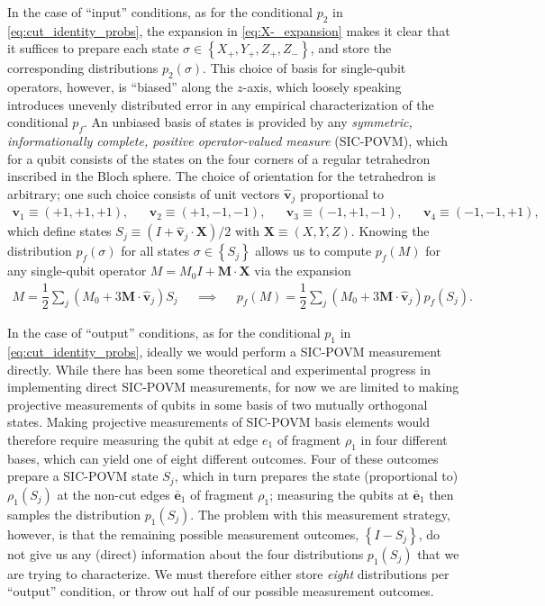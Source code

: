 \documentclass[nofootinbib,notitlepage,11pt]{revtex4-2}
\newcommand{\f}[2]{\dfrac{#1}{#2}} %
\newcommand{\p}[1]{\left(#1\right)} %
\renewcommand{\set}[1]{\left\{#1\right\}} %
\renewcommand{\v}{\bm} %
\newcommand{\uv}[1]{\bm{\hat{#1}}} %
\renewcommand{\c}{\cdot} %
\begin{document}
In the case of ``input'' conditions, as for the conditional $p_2$ in
\eqref{eq:cut_identity_probs}, the expansion in
\eqref{eq:X-_expansion} makes it clear that it suffices to prepare
each state $\sigma \in \set{X_+,Y_+,Z_+,Z_-}$, and store the
corresponding distributions $p_2\p{\sigma}$.  This choice of basis for
single-qubit operators, however, is ``biased'' along the $z$-axis,
which loosely speaking introduces unevenly distributed error in any
empirical characterization of the conditional $p_f$.  An unbiased
basis of states is provided by any {\it symmetric, informationally
  complete, positive operator-valued measure} (SIC-POVM), which for a
qubit consists of the states on the four corners of a regular
tetrahedron inscribed in the Bloch sphere.  The choice of orientation
for the tetrahedron is arbitrary; one such choice consists of unit
vectors $\uv v_j$ proportional to
\begin{align}
  \v v_1 \equiv \p{ +1, +1, +1 }, &&
  \v v_2 \equiv \p{ +1, -1, -1 }, &&
  \v v_3 \equiv \p{ -1, +1, -1 }, &&
  \v v_4 \equiv \p{ -1, -1, +1 },
\end{align}
which define states $S_j\equiv\p{I+\uv v_j\c\v X}/2$ with
$\v X\equiv\p{X,Y,Z}$.  Knowing the distribution $p_f\p{\sigma}$ for
all states $\sigma\in\set{S_j}$ allows us to compute $p_f\p{M}$ for
any single-qubit operator $M=M_0I+\v M\c\v X$ via the expansion
\begin{align}
  M = \f12 \sum_j \p{ M_0 + 3 \v M\c\uv v_j } S_j
  &&
  \implies
  &&
  p_f\p{M} = \f12 \sum_j \p{ M_0 + 3 \v M\c\uv v_j } p_f\p{S_j}.
  \label{eq:SIC_expansion}
\end{align}

In the case of ``output'' conditions, as for the conditional $p_1$ in
\eqref{eq:cut_identity_probs}, ideally we would perform a SIC-POVM
measurement directly.  While there has been some
theoretical\cite{tabia2012experimental} and
experimental\cite{bent2015experimental, bian2015realization} progress
in implementing direct SIC-POVM measurements, for now we are limited
to making projective measurements of qubits in some basis of two
mutually orthogonal states.  Making projective measurements of
SIC-POVM basis elements would therefore require measuring the qubit at
edge $e_1$ of fragment $\rho_1$ in four different bases, which can
yield one of eight different outcomes.  Four of these outcomes prepare
a SIC-POVM state $S_j$, which in turn prepares the state (proportional
to) $\rho_1\p{S_j}$ at the non-cut edges $\bar{\v e}_1$ of fragment
$\rho_1$; measuring the qubits at $\bar{\v e}_1$ then samples the
distribution $p_1\p{S_j}$.  The problem with this measurement
strategy, however, is that the remaining possible measurement
outcomes, $\set{I-S_j}$, do not give us any (direct) information about
the four distributions $p_1\p{S_j}$ that we are trying to
characterize.  We must therefore either store {\it eight}
distributions per ``output'' condition, or throw out half of our
possible measurement outcomes.
\end{document}
